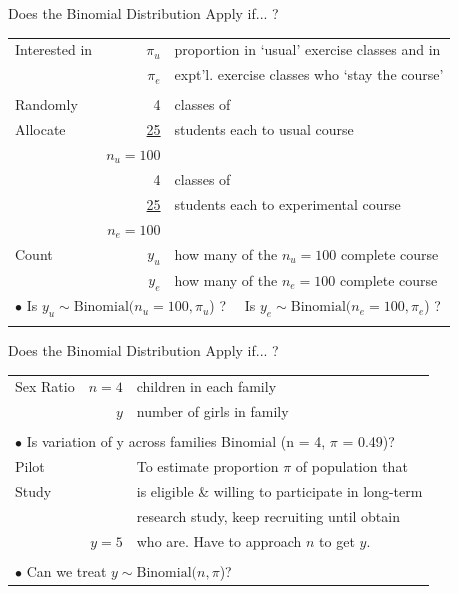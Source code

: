 \documentclass{beamer}\usepackage[]{graphicx}\usepackage[]{color}
\begin{document}
\begin{frame}{Does the Binomial Distribution Apply if... ?}

\small
\begin{tabular}{lrl}
	\hline
	
	Interested in & $\pi _{u}$      &   proportion in `usual' exercise classes and in  \\
	& $\pi _{e}$      &   expt'l. exercise classes who `stay the course'  \\
	& & \\
	Randomly & 4   & classes of\\ 
	Allocate    &  \underline{25} & students each to usual course \\
	& $n_{u} = 100$ &  \\
	& 4  & classes of\\
	&  \underline{25} & students each to experimental course \\
	& $n_{e} =100$ &  \\
	
	Count & $y_u$ & how many of the $n_{u}=100$ complete course \\
	& $y_e$ & how many of the $n_{e}=100$  complete course \\
	
	\multicolumn{3}{l}{$\bullet$ Is $y_{u} \sim \textrm{Binomial}(n_{u} = 100,  \pi _{u}$) ?
		\ \  Is $y_{e} \sim \textrm{Binomial}(n_{e} = 100,  \pi _{e}$) ?} \\
	& & \\
	\hline
\end{tabular}
\end{frame}



\begin{frame}{Does the Binomial Distribution Apply if... ?}

\small
\begin{tabular}{lrl}
	\hline
	Sex Ratio & $n=4$& children in each family  \\
	& $y$ & number of girls in family \\
	& & \\
	\multicolumn{3}{l}{$\bullet$ Is variation of y across families Binomial (n = 4, $\pi $ = 0.49)?} \\
	\hline
	Pilot  &   &To estimate proportion $\pi$ of population that\\ 
	Study&   &  is eligible \& willing to participate in long-term\\
	&   & research study, keep recruiting until obtain   \\
	& $y=5$ &  who are. Have to approach $n$ to get $y$. \\
	& & \\
	\multicolumn{3}{l}{$\bullet$ Can we treat $y \sim \textrm{Binomial}(n, \pi$)?} \\
	\hline
\end{tabular}
\end{frame}
\end{document}
